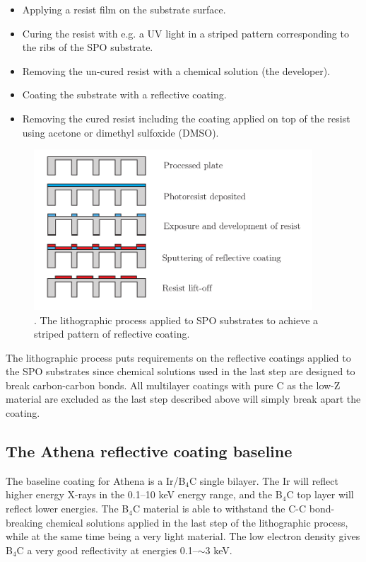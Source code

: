 \begin{itemize}
  \item Applying a resist film on the substrate surface.
  \item Curing the resist with e.g. a UV light in a striped pattern corresponding to the ribs of the SPO substrate.
  \item Removing the un-cured resist with a chemical solution (the developer).
  \item Coating the substrate with a reflective coating.
  \item Removing the cured resist including the coating applied on top of the resist using acetone or dimethyl sulfoxide (DMSO).
\end{itemize}

\begin{figure}[!h]
  \center
  \includegraphics[height=6cm]{figures/athena/litho_process.pdf}
\caption{\footnotesize. The lithographic process applied to SPO substrates to achieve a striped pattern of reflective coating.}\label{fig:litho_process}
\end{figure}

The lithographic process puts requirements on the reflective coatings applied to the SPO substrates since chemical solutions used in the last step are designed to break carbon-carbon bonds. All multilayer coatings with pure C as the low-Z material are excluded as the last step described above will simply break apart the coating.

\subsection{The Athena reflective coating baseline}
The baseline coating for Athena is a Ir/B$_4$C single bilayer. The Ir will reflect higher energy X-rays in the 0.1--10 keV energy range, and the B$_4$C top layer will reflect lower energies. The B$_4$C material is able to withstand the C-C bond-breaking chemical solutions applied in the last step of the lithographic process, while at the same time being a very light material. The low electron density gives B$_4$C a very good reflectivity at energies 0.1--$\sim$3 keV.

